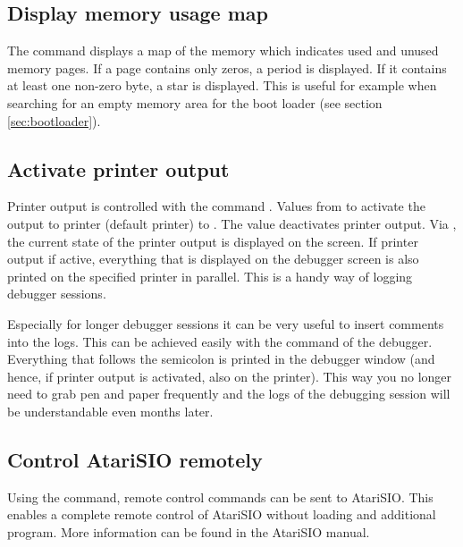 \subsection{Display memory usage map}
The command  displays a map of the memory which indicates used and unused
memory pages. If a page contains only zeros, a period  is
displayed. If it contains at least one non-zero byte, a star \fq{\fmsg{*}} is
displayed. This is useful for example when searching for an empty memory area
for the boot loader (see section \ref{sec:bootloader}).

\subsection{Activate printer output}
Printer output is controlled with the command .
Values from  to  activate the output to printer 
(default printer) to . The value  deactivates printer output.
Via , the current state of the printer output is displayed on the
screen. If printer output if active, everything that is displayed on the
debugger screen is also printed on the specified printer in parallel. This is a
handy way of logging debugger sessions.

Especially for longer debugger sessions it can be very useful to insert comments
into the logs. This can be achieved easily with the \fq{\fcmd{;}} command of the
debugger. Everything that follows the semicolon is printed in the debugger
window (and hence, if printer output is activated, also on the printer). This
way you no longer need to grab pen and paper frequently and the logs of the
debugging session will be understandable even months later.

\subsection{Control AtariSIO remotely}
Using the  command, remote control commands can be sent to AtariSIO.
This enables a complete remote control of AtariSIO without loading and
additional program. More information can be found in the AtariSIO manual.
